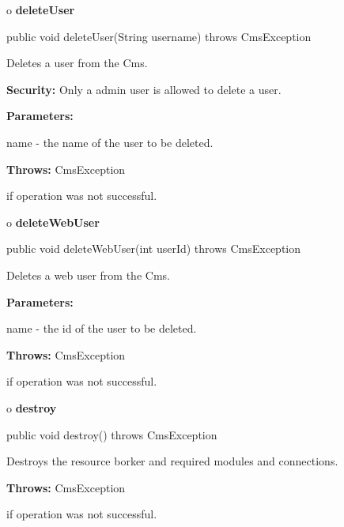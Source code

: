 o {\bf deleteUser}

\begin{PRE}
 public void deleteUser(String username) throws CmsException
\end{PRE}

\begin{description}
\htmlDD Deletes a user from the Cms.

{\bf Security:} Only a admin user is allowed to delete a user.

\begin{description}
\item {\bf Parameters:}

name - the name of the user to be deleted.
\item {\bf Throws:} CmsException

if operation was not successful.
\end{description}

\end{description}

o {\bf deleteWebUser}

\begin{PRE}
 public void deleteWebUser(int userId) throws CmsException
\end{PRE}

\begin{description}
\htmlDD Deletes a web user from the Cms.

\begin{description}
\item {\bf Parameters:}

name - the id of the user to be deleted.
\item {\bf Throws:} CmsException

if operation was not successful.
\end{description}

\end{description}

o {\bf destroy}

\begin{PRE}
 public void destroy() throws CmsException
\end{PRE}

\begin{description}
\htmlDD Destroys the resource borker and required modules and connections.

\begin{description}
\item {\bf Throws:} CmsException

if operation was not successful.
\end{description}

\end{description}

